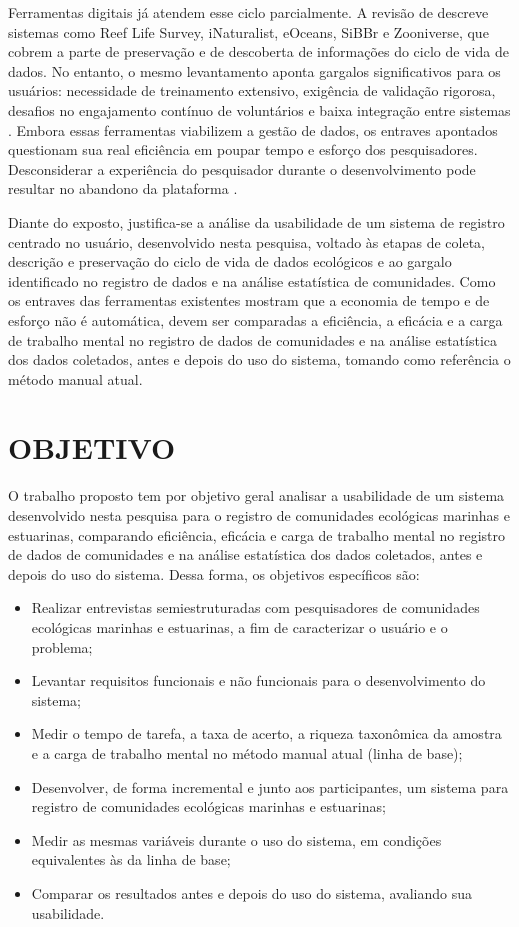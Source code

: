 \documentclass[
	12pt,				%
	oneside,			%
	a4paper,			%
	chapter=TITLE,		%
	section=TITLE,		%
	subsection=TITLE,	%
	subsubsection=TITLE,%
	english,			%
	french,				%
	spanish,			%
	brazilian,				%
	]{abntex2}
\begin{document}
Ferramentas digitais já atendem esse ciclo parcialmente. A revisão de  descreve sistemas como Reef Life Survey, iNaturalist, eOceans, SiBBr e Zooniverse, que cobrem a parte de preservação e de descoberta de informações do ciclo de vida de dados. No entanto, o mesmo levantamento aponta gargalos significativos para os usuários: necessidade de treinamento extensivo, exigência de validação rigorosa, desafios no engajamento contínuo de voluntários e baixa integração entre sistemas \cite{travassos_ferramenta_2025}.
Embora essas ferramentas viabilizem a gestão de dados, os entraves apontados questionam sua real eficiência em poupar tempo e esforço dos pesquisadores. Desconsiderar a experiência do pesquisador durante o desenvolvimento pode resultar no abandono da plataforma \cite{michener_participatory_2012}.

Diante do exposto, justifica-se a análise da usabilidade de um sistema de registro centrado no usuário, desenvolvido nesta pesquisa, voltado às etapas de coleta, descrição e preservação do ciclo de vida de dados ecológicos e ao gargalo identificado no registro de dados e na análise estatística de comunidades. Como os entraves das ferramentas existentes mostram que a economia de tempo e de esforço não é automática, devem ser comparadas a eficiência, a eficácia e a carga de trabalho mental no registro de dados de comunidades e na análise estatística dos dados coletados, antes e depois do uso do sistema, tomando como referência o método manual atual.


\section{OBJETIVO}
O trabalho proposto tem por objetivo geral analisar a usabilidade de um sistema desenvolvido nesta pesquisa para o registro de comunidades ecológicas marinhas e estuarinas, comparando eficiência, eficácia e carga de trabalho mental no registro de dados de comunidades e na análise estatística dos dados coletados, antes e depois do uso do sistema. Dessa forma, os objetivos específicos são:

\begin{itemize}
\item Realizar entrevistas semiestruturadas com pesquisadores de comunidades ecológicas marinhas e estuarinas, a fim de caracterizar o usuário e o problema;
\item Levantar requisitos funcionais e não funcionais para o desenvolvimento do sistema;
\item Medir o tempo de tarefa, a taxa de acerto, a riqueza taxonômica da amostra e a carga de trabalho mental no método manual atual (linha de base);
\item Desenvolver, de forma incremental e junto aos participantes, um sistema para registro de comunidades ecológicas marinhas e estuarinas;
\item Medir as mesmas variáveis durante o uso do sistema, em condições equivalentes às da linha de base;
\item Comparar os resultados antes e depois do uso do sistema, avaliando sua usabilidade.
\end{itemize}
\end{document}

